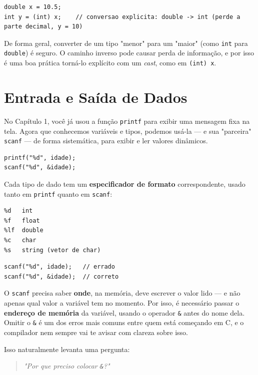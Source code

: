 \documentclass[12pt,a4paper,oneside]{extreport}
\begin{document}
\begin{lstlisting}
double x = 10.5;
int y = (int) x;    // conversao explicita: double -> int (perde a parte decimal, y = 10)
\end{lstlisting}

De forma geral, converter de um tipo "menor" para um "maior" (como \texttt{int} para \texttt{double}) é seguro. O caminho inverso pode causar perda de informação, e por isso é uma boa prática torná-lo explícito com um \textit{cast}, como em \texttt{(int) x}.

\section{Entrada e Saída de Dados}
No Capítulo 1, você já usou a função \texttt{printf} para exibir uma mensagem fixa na tela. Agora que conhecemos variáveis e tipos, podemos usá-la — e sua "parceira" \texttt{scanf} — de forma sistemática, para exibir e ler valores dinâmicos.

\begin{lstlisting}
printf("%d", idade);
scanf("%d", &idade);
\end{lstlisting}

Cada tipo de dado tem um \textbf{especificador de formato} correspondente, usado tanto em \texttt{printf} quanto em \texttt{scanf}:

\begin{lstlisting}
%d   int
%f   float
%lf  double
%c   char
%s   string (vetor de char)
\end{lstlisting}

\begin{errocomum}
\begin{lstlisting}
scanf("%d", idade);   // errado
scanf("%d", &idade);  // correto
\end{lstlisting}
O \texttt{scanf} precisa saber \textbf{onde}, na memória, deve escrever o valor lido — e não apenas qual valor a variável tem no momento. Por isso, é necessário passar o \textbf{endereço de memória} da variável, usando o operador \texttt{\&} antes do nome dela. Omitir o \texttt{\&} é um dos erros mais comuns entre quem está começando em C, e o compilador nem sempre vai te avisar com clareza sobre isso.
\end{errocomum}

Isso naturalmente levanta uma pergunta:

\begin{quote}
\textit{"Por que preciso colocar \texttt{\&}?"}
\end{quote}
\end{document}
